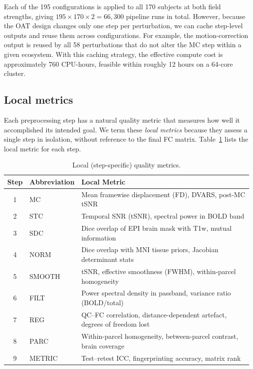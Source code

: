\documentclass[11pt,a4paper]{article}
\begin{document}
Each of the 195 configurations is applied to all 170 subjects at both field strengths, giving $195 \times 170 \times 2 = 66{,}300$ pipeline runs in total.  However, because the OAT design changes only one step per perturbation, we can cache step-level outputs and reuse them across configurations.  For example, the motion-correction output is reused by all 58 perturbations that do not alter the MC step within a given ecosystem.  With this caching strategy, the effective compute cost is approximately 760 CPU-hours, feasible within roughly 12 hours on a 64-core cluster.

\subsection{Local metrics}
\label{sec:local_metrics}

Each preprocessing step has a natural quality metric that measures how well it accomplished its intended goal.  We term these \emph{local metrics} because they assess a single step in isolation, without reference to the final FC matrix.  Table~\ref{tab:local_metrics} lists the local metric for each step.

\begin{table}[H]
\centering
\caption{Local (step-specific) quality metrics.}
\label{tab:local_metrics}
\begin{tabular}{@{}cll@{}}
\toprule
Step & Abbreviation & Local Metric \\
\midrule
1 & MC     & Mean framewise displacement (FD), DVARS, post-MC tSNR \\
2 & STC    & Temporal SNR (tSNR), spectral power in BOLD band \\
3 & SDC    & Dice overlap of EPI brain mask with T1w, mutual information \\
4 & NORM   & Dice overlap with MNI tissue priors, Jacobian determinant stats \\
5 & SMOOTH & tSNR, effective smoothness (FWHM), within-parcel homogeneity \\
6 & FILT   & Power spectral density in passband, variance ratio (BOLD/total) \\
7 & REG    & QC--FC correlation, distance-dependent artefact, degrees of freedom lost \\
8 & PARC   & Within-parcel homogeneity, between-parcel contrast, brain coverage \\
9 & METRIC & Test--retest ICC, fingerprinting accuracy, matrix rank \\
\bottomrule
\end{tabular}
\end{table}
\end{document}
